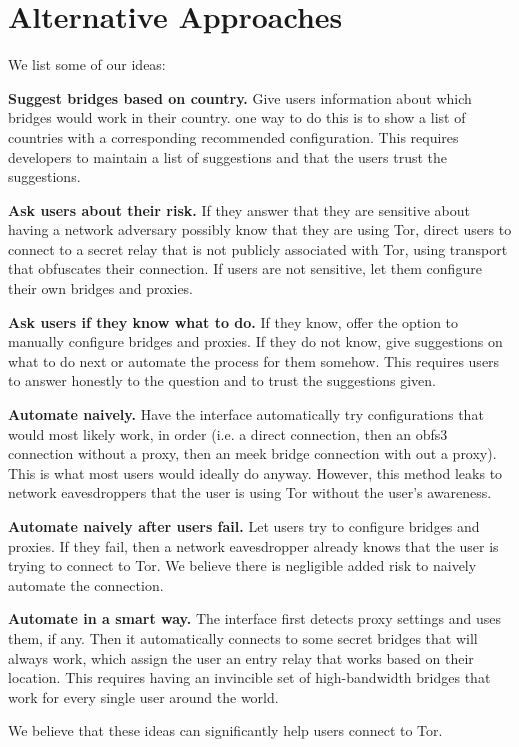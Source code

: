 \documentclass[USenglish,oneside,twocolumn]{article}
\begin{document}
\section{Alternative Approaches} 
\label{alternatives}
We list some of our ideas:\\
\begin{description}
\item{\bfseries Suggest bridges based on country.} Give users information about which bridges would work in their country. one way to do this is to show a list of countries with a corresponding recommended configuration. This requires developers to maintain a list of suggestions and that the users trust the suggestions. 
\item{\bfseries Ask users about their risk.} If they answer that they are sensitive about having a network adversary possibly know that they are using Tor, direct users to connect to a secret relay that is not publicly associated with Tor, using transport that obfuscates their connection. If users are not sensitive, let them configure their own bridges and proxies. 
\item{\bfseries Ask users if they know what to do.} If they know, offer the option to manually configure bridges and proxies. If they do not know, give suggestions on what to do next or automate the process for them somehow. This requires users to answer honestly to the question and to trust the suggestions given. 
\item{\bfseries Automate naively.} Have the interface automatically try configurations that would most likely work, in order (i.e. a direct connection, then an obfs3 connection without a proxy, then an meek bridge connection with out a proxy). This is what most users would ideally do anyway. However, this method leaks to network eavesdroppers that the user is using Tor without the user's awareness. 
\item {\bfseries Automate naively after users fail.} Let users try to configure bridges and proxies. If they fail, then a network eavesdropper already knows that the user is trying to connect to Tor. We believe there is negligible added risk to naively automate the connection. 
\item{\bfseries Automate in a smart way.} The interface first detects proxy settings and uses them, if any. Then it automatically connects to some secret bridges that will always work, which assign the user an entry relay that works based on their location. This requires having an invincible set of high-bandwidth bridges that work for every single user around the world.  
\end{description}
We believe that these ideas can significantly help users connect to Tor. 
\end{document}
